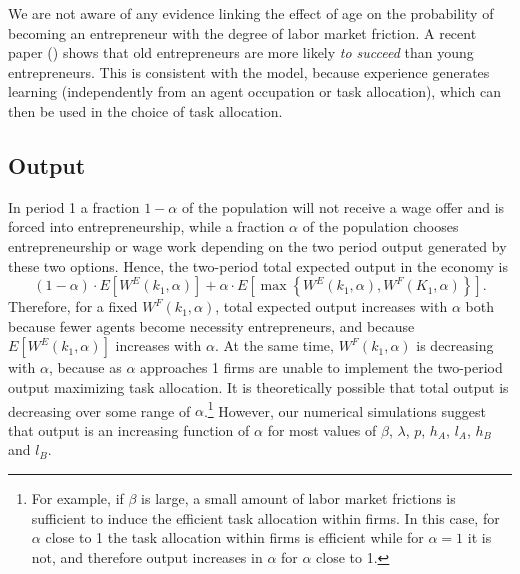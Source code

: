 \documentclass[12pt,american]{paper}
\theoremstyle{remark}
\begin{document}
We are not aware of any evidence linking the effect of age on the probability of becoming an entrepreneur with the degree of labor market friction. A  recent  paper (\citeauthor*[forthcoming]{azoulay2018age}) shows that old entrepreneurs are more likely \textit{to succeed} than young entrepreneurs. This is consistent with the model, because experience generates learning (independently from an agent occupation or task allocation), which can then be used in the choice of task allocation.

\subsection{Output}
In period 1 a fraction $1-\alpha$ of the population will not receive a wage offer and is forced into entrepreneurship, while a fraction $\alpha$ of the population chooses entrepreneurship or wage work depending on the two period output generated by these two options. Hence, the two-period total expected output in the economy is
\[
(1-\alpha) \cdot E[W^E(k_1,\alpha)] + \alpha \cdot E[ \max\left\lbrace W^E(k_1,\alpha), W^F(K_1,\alpha) \right\rbrace ].
\]
Therefore, for a fixed $W^F(k_1,\alpha)$, total expected output increases with $\alpha$ both because fewer agents become necessity entrepreneurs, and because $E[W^E(k_1,\alpha)]$ increases with $\alpha$. At the same time, $W^F(k_1,\alpha)$ is decreasing with $\alpha$, because as $\alpha$ approaches 1 firms are unable to implement the two-period output maximizing task allocation. It is theoretically possible that total output is decreasing over some range of $\alpha$.\footnote{For example, if $\beta$ is large, a small amount of labor market frictions is sufficient to induce the efficient task allocation within firms. In this case, for $\alpha$ close to 1 the task allocation within firms is efficient while for $\alpha=1$ it is not, and therefore output increases in $\alpha$ for $\alpha$ close to 1. } However, our numerical simulations suggest that output is an increasing function of $\alpha$ for most values of $\beta$, $\lambda$, $p$, $h_A$, $l_A$, $h_B$ and $l_B$.

\end{document}
